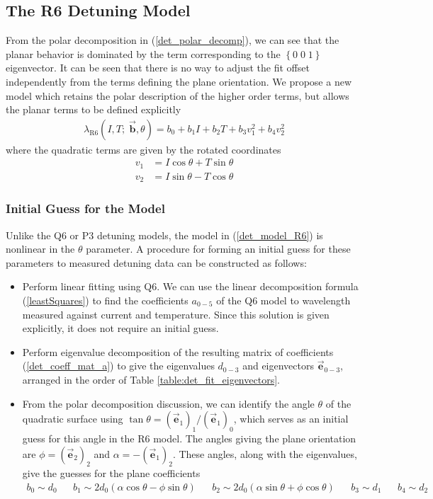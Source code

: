 \documentclass[8pt,a4paper]{report}
\begin{document}
	
	\subsection{The R6 Detuning Model} \label{sec:det_R6}
	
	From the polar decomposition in (\ref{det_polar_decomp}), we can see that the planar behavior is dominated by the term corresponding to the $\left\{0\;0\;1\right\}$ eigenvector. It can be seen that there is no way to adjust the fit offset independently from the terms defining the plane orientation. We propose a new model which retains the polar description of the higher order terms, but allows the planar terms to be defined explicitly
	\begin{align} \label{det_model_R6}
		\lambda_\mathrm{R6}(I, T;\; \vec{\textbf{b}},\theta) = b_0 + b_1 I + b_2 T + b_3 v_1^2 + b_4 v_2^2
	\end{align}
	where the quadratic terms are given by the rotated coordinates
	\begin{align}
		v_1 &= I\cos\theta + T\sin\theta \nonumber\\
		v_2 &= I\sin\theta - T\cos\theta
	\end{align}
	
	\subsubsection{Initial Guess for the Model}
	Unlike the Q6 or P3 detuning models, the model in (\ref{det_model_R6}) is nonlinear in the $\theta$ parameter. A procedure for forming an initial guess for these parameters to measured detuning data can be constructed as follows:
	\begin{itemize}
		\item Perform linear fitting using Q6. We can use the linear decomposition formula (\ref{leastSquares}) to find the coefficients $a_{0-5}$ of the Q6 model to wavelength measured against current and temperature. Since this solution is given explicitly, it does not require an initial guess.
		\item Perform eigenvalue decomposition of the resulting matrix of coefficients (\ref{det_coeff_mat_a}) to give the eigenvalues $d_{0-3}$ and eigenvectors $\vec{\textbf{e}}_{0-3}$, arranged in the order of Table \ref{table:det_fit_eigenvectors}.
		\item From the polar decomposition discussion, we can identify the angle $\theta$ of the quadratic surface using $\tan\theta = (\vec{\textbf{e}}_1)_1 / (\vec{\textbf{e}}_1)_0$, which serves as an initial guess for this angle in the R6 model. The angles giving the plane orientation are $\phi = (\vec{\textbf{e}}_2)_2$ and $\alpha = -(\vec{\textbf{e}}_1)_2$. These angles, along with the eigenvalues, give the guesses for the plane coefficients
		\begin{align}
			b_0 \sim d_0 && b_1 \sim 2d_0\left(\alpha \cos\theta - \phi \sin \theta\right) && b_2 \sim 2d_0 \left(\alpha \sin\theta + \phi \cos\theta\right) && b_3 \sim d_1 && b_4 \sim d_2
		\end{align}
	\end{itemize}
	
\end{document}
